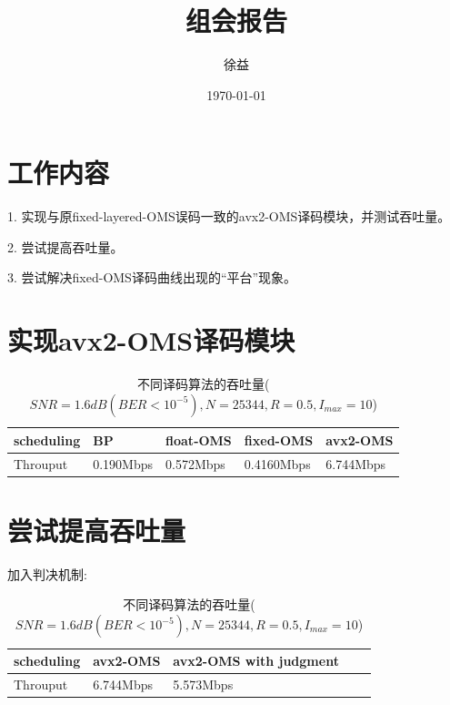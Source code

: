 \documentclass{article}
\title{组会报告}
\author{徐益}
\date{\today}
\begin{document}
\maketitle


\section{工作内容}
1. 实现与原fixed-layered-OMS误码一致的avx2-OMS译码模块，并测试吞吐量。

2. 尝试提高吞吐量。

3. 尝试解决fixed-OMS译码曲线出现的“平台”现象。

\section{实现avx2-OMS译码模块}
\begin{table}[H]
	\caption{不同译码算法的吞吐量($SNR=1.6dB(BER<10^{-5}), N=25344,R=0.5,I_{max}=10$)}
	\centering
	\begin{tabular}{|l|l|l|l|l|}%
		\hline  %
		scheduling	& BP		& float-OMS	&	fixed-OMS	& avx2-OMS	\\
		\hline
		Throuput	& 0.190Mbps	& 0.572Mbps	&	0.4160Mbps	& 6.744Mbps	\\
		\hline  %
	\end{tabular}
\end{table}

\section{尝试提高吞吐量}
加入判决机制:
\begin{table}[H]
	\caption{不同译码算法的吞吐量($SNR=1.6dB(BER<10^{-5}), N=25344,R=0.5,I_{max}=10$)}
	\centering
	\begin{tabular}{|l|l|l|l|l|}%
		\hline  %
		scheduling	&	avx2-OMS	& avx2-OMS with judgment	\\
		\hline
		Throuput	&	6.744Mbps	& 5.573Mbps					\\
		\hline  %
	\end{tabular}
\end{table}
\end{document}
